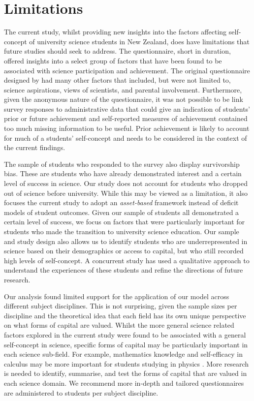 \section*{Limitations}
The current study, whilst providing new insights into the factors affecting self-concept of university science students in New Zealand, does have limitations that future studies should seek to address. The questionnaire, short in duration, offered insights into a select group of factors that have been found to be associated with science participation and achievement. The original questionnaire designed by \cite{dewitt2011high} had many other factors that included, but were not limited to, science aspirations, views of scientists, and parental involvement. Furthermore, given the anonymous nature of the questionnaire, it was not possible to be link survey responses to administrative data that could give an indication of students' prior or future achievement and self-reported measures of achievement contained too much missing information to be useful. Prior achievement is likely to account for much of a students' self-concept and needs to be considered in the context of the current findings.

The sample of students who responded to the survey also display survivorship bias. These are students who have already demonstrated interest and a certain level of success in science. Our study does not account for students who dropped out of science before university. While this may be viewed as a limitation, it also focuses the current study to adopt an \textit{asset-based} framework instead of deficit models of student outcomes. Given our sample of students all demonstrated a certain level of success, we focus on factors that were particularly important for students who made the transition to university science education. Our sample and study design also allows us to identify students who are underrepresented in science based on their demographics or access to capital, but who still recorded high levels of self-concept. A concurrent study has used a qualitative approach to understand the experiences of these students and refine the directions of future research.

Our analysis found limited support for the application of our model across different subject disciplines. This is not surprising, given the sample sizes per discipline and the theoretical idea that each field has its own unique perspective on what forms of capital are valued. Whilst the more general science related factors explored in the current study were found to be associated with a general self-concept in science, specific forms of capital may be particularly important in each science sub-field. For example, mathematics knowledge and self-efficacy in calculus may be more important for students studying in physics \cite{Black2016,Ellis_2016}. More research is needed to identify, summarise, and test the forms of capital that are valued in each science domain. We recommend more in-depth and tailored questionnaires are administered to students per subject discipline.  

